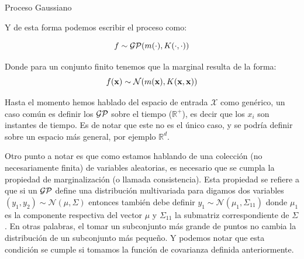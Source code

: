 \documentclass[9pt]{beamer}
\begin{document}
\begin{frame}{Proceso Gaussiano}

Y de esta forma podemos escribir el proceso como: \pause 

\begin{equation*}
  f \sim \mathcal{GP}(m(\cdot), K(\cdot, \cdot))
\end{equation*}  \pause 

Donde para un conjunto finito tenemos que la marginal resulta de la forma:
\pause
\begin{equation*}
  f(\mathbf{x}) \sim \mathcal{N}(m(\mathbf{x}), K(\mathbf{x}, \mathbf{x}))
\end{equation*} \pause 



Hasta el momento hemos hablado del espacio de entrada $\mathcal{X}$ como genérico, un caso común es definir los $\mathcal{GP}$ sobre el tiempo ($\mathbb{R}^{+}$), es decir que los $x_i$ son instantes de tiempo. Es de notar que este no es el único caso, y se podría definir sobre un espacio más general, por ejemplo $\mathbb{R}^d$. \pause

\vspace{0.2cm}

Otro punto a notar es que como estamos hablando de una colección (no necesariamente finita) de variables aleatorias, es necesario que se cumpla la propiedad de marginalización (o llamada consistencia). Esta propiedad se refiere a que si un $\mathcal{GP}$ define una distribución multivariada para digamos dos variables $(y_1, y_2) \sim \mathcal{N}(\mu, \Sigma)$ entonces también debe definir $y_1 \sim \mathcal{N}(\mu_1, \Sigma_{11})$ donde $\mu_1$ es la componente respectiva del vector $\mu$ y $\Sigma_{11}$ la submatriz correspondiente de $\Sigma$. En otras palabras, el tomar un subconjunto más grande de puntos no cambia la distribución de un subconjunto más pequeño. Y podemos notar que esta condición se cumple si tomamos la función de covarianza definida anteriormente.

\end{frame}
\end{document}

